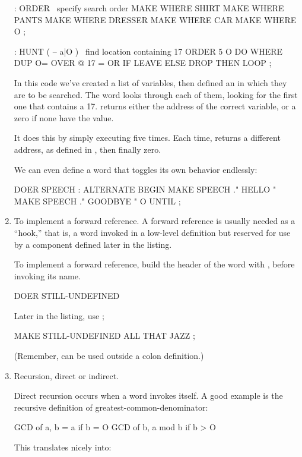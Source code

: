 \begin{enumerate}
\begin{Code}
: ORDER  \  specify search order
   MAKE WHERE  SHIRT   MAKE WHERE  PANTS
   MAKE WHERE  DRESSER   MAKE WHERE CAR
   MAKE WHERE  O ;

: HUNT  ( -- a|O )  \  find location containing 17
   ORDER  5 O DO  WHERE  DUP O=  OVER @  17 =  OR  IF
      LEAVE  ELSE  DROP  THEN  LOOP ;
\end{Code}
In this code we've created a list of variables, then defined an
 in which they are to be searched. The word 
looks through each of them, looking for the first one that contains a 17.
 returns either the address of the correct variable, or a zero
if none have the value.

It does this by simply executing  five times. Each time,
 returns a different address, as defined in ,
then finally zero.

We can even define a  word that toggles its own behavior
endlessly:

\begin{Code}
DOER SPEECH
: ALTERNATE
   BEGIN  MAKE SPEECH ." HELLO "
   MAKE SPEECH ." GOODBYE "
   O UNTIL ;
\end{Code}
\item To implement a forward reference. A forward reference is usually
needed as a ``hook,'' that is, a word invoked in a low-level definition
but reserved for use by a component defined later in the listing.

To implement a forward reference, build the header of the word with
, before invoking its name.

\begin{Code}
DOER STILL-UNDEFINED
\end{Code}
Later in the listing, use ;

\begin{Code}
MAKE STILL-UNDEFINED  ALL THAT JAZZ ;
\end{Code}
(Remember,  can be used outside a colon definition.)

\item Recursion, direct or indirect.

Direct recursion occurs when a word invokes itself. A good example is the
recursive definition of greatest-common-denominator:

\begin{Code}
GCD of a, b =  a                     if b = O
               GCD of b, a mod b     if b > O
\end{Code}
This translates nicely into:


\end{enumerate}
